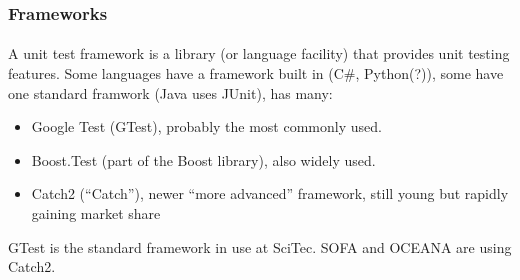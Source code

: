 \begin{frame}[fragile]
\frametitle{Frameworks}
\framesubtitle{}
A unit test framework is a library (or language facility) that
provides unit testing features. Some languages have a framework built
in (C\#, Python(?)), some have one standard framwork (Java uses
JUnit), \CC has many:
\begin{itemize}
\item Google Test (GTest), probably the most commonly used.
\item Boost.Test (part of the Boost library), also widely used.
\item Catch2 (``Catch''), newer ``more advanced'' framework, still
  young but rapidly gaining market share
\end{itemize}
\vskip 6pt
GTest is the standard framework in use at SciTec.  SOFA and OCEANA are using
Catch2.
\vskip 6pt
\begin{center}
\end{center}

\end{frame}



